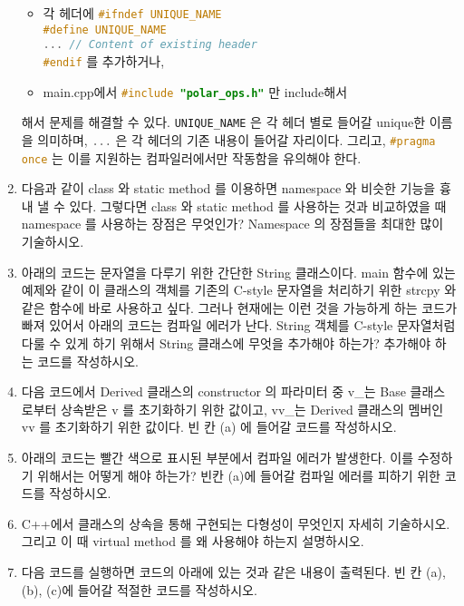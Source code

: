 \documentclass{article}
\newcommand{\inline}[1]{%
    \colorbox{beta-gray}{\lstinline[language=C++]{#1}}%
}
\begin{document}
\begin{enumerate}[itemsep=30pt]
\begin{itemize}
                  \item 각 헤더에 \inline{#ifndef UNIQUE_NAME}\\\inline{#define UNIQUE_NAME}\\\inline{... // Content of existing header}\\\inline{#endif}를 추가하거나,
                  \item main.cpp에서 \inline{#include "polar_ops.h"}만 include해서
              \end{itemize}해서 문제를 해결할 수 있다. \inline{UNIQUE_NAME}은 각 헤더 별로 들어갈 unique한 이름을 의미하며, \inline{...}은 각 헤더의 기존 내용이 들어갈 자리이다. 그리고, \inline{#pragma once}는 이를 지원하는 컴파일러에서만 작동함을 유의해야 한다.

        \item 다음과 같이 class 와 static method 를 이용하면 namespace 와 비슷한 기능을 흉내 낼 수 있다. 그렇다면 class 와 static method 를 사용하는 것과 비교하였을 때 namespace 를 사용하는 장점은 무엇인가? Namespace 의 장점들을 최대한 많이 기술하시오.
        \item 아래의 코드는 문자열을 다루기 위한 간단한 String 클래스이다. main 함수에 있는 예제와 같이 이 클래스의 객체를 기존의 C-style 문자열을 처리하기 위한 strcpy 와 같은 함수에 바로 사용하고 싶다. 그러나 현재에는 이런 것을 가능하게 하는 코드가 빠져 있어서 아래의 코드는 컴파일 에러가 난다. String 객체를 C-style 문자열처럼 다룰 수 있게 하기 위해서 String 클래스에 무엇을 추가해야 하는가? 추가해야 하는 코드를 작성하시오.
        \item 다음 코드에서 Derived 클래스의 constructor 의 파라미터 중 v\_는 Base 클래스로부터 상속받은 v 를 초기화하기 위한 값이고, vv\_는 Derived 클래스의 멤버인 vv 를 초기화하기 위한 값이다. 빈 칸 (a) 에 들어갈 코드를 작성하시오.
        \item 아래의 코드는 빨간 색으로 표시된 부분에서 컴파일 에러가 발생한다. 이를 수정하기 위해서는 어떻게 해야 하는가? 빈칸 (a)에 들어갈 컴파일 에러를 피하기 위한 코드를 작성하시오.
        \item C++에서 클래스의 상속을 통해 구현되는 다형성이 무엇인지 자세히 기술하시오. 그리고 이 때 virtual method 를 왜 사용해야 하는지 설명하시오.
        \item 다음 코드를 실행하면 코드의 아래에 있는 것과 같은 내용이 출력된다. 빈 칸 (a), (b), (c)에 들어갈 적절한 코드를 작성하시오.
    \end{enumerate}
\end{document}
